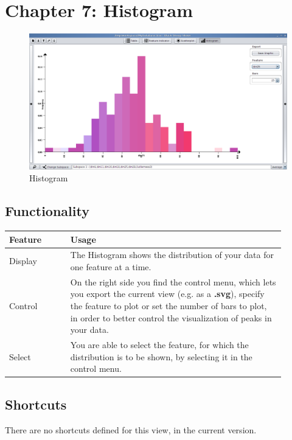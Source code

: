 
\section{\color{fancy}Chapter 7: Histogram}

\begin{figure}[h]
  \centering
  \includegraphics[width=16cm]{images/bsv/Histogram.png}
  \caption{Histogram}
  \label{fig:histogram}
\end{figure}

\subsection{Functionality}
\begin{tabular}{p{0.2\linewidth}p{0.7\linewidth}}
  \color{fancy}Feature & \color{fancy}Usage \\ \hline
  Display & The Histogram shows the distribution of your data for one feature at a time. \\ \hline
  Control & On the right side you find the control menu, which lets you export the current view (e.g. as a \textbf{.svg}), specify the feature to plot or set the number of bars to plot, in order to better control the visualization of peaks in your data. \\ \hline
  Select & You are able to select the feature, for which the distribution is to be shown, by selecting it in the control menu. \\ \hline
\end{tabular}

\subsection{Shortcuts}
There are no shortcuts defined for this view, in the current version.
